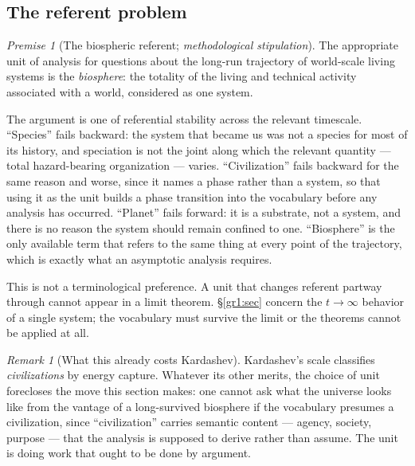 \documentclass[11pt]{article}
\numberwithin{equation}{section}
\theoremstyle{plain}
\theoremstyle{definition}
\theoremstyle{remark}
\newtheorem{remark}[theorem]{Remark}
\newtheorem{premise}{Premise}
\begin{document}
\subsection{The referent problem}\label{gr:sub:referent}

\begin{premise}[The biospheric referent; \emph{methodological
stipulation}]\label{gr:phi1}
The appropriate unit of analysis for questions about the long-run
trajectory of world-scale living systems is the \emph{biosphere}: the
totality of the living and technical activity associated with a world,
considered as one system.
\end{premise}

The argument is one of referential stability across the relevant
timescale. ``Species'' fails backward: the system that became us was
not a species for most of its history, and speciation is not the joint
along which the relevant quantity --- total hazard-bearing organization
--- varies. ``Civilization'' fails backward for the same reason and
worse, since it names a phase rather than a system, so that using it as
the unit builds a phase transition into the vocabulary before any
analysis has occurred. ``Planet'' fails forward: it is a substrate, not
a system, and there is no reason the system should remain confined to
one. ``Biosphere'' is the only available term that refers to the same
thing at every point of the trajectory, which is exactly what an
asymptotic analysis requires.

This is not a terminological preference. A unit that changes referent
partway through cannot appear in a limit theorem. \S\ref{gr1:sec} concern
the $t\to\infty$ behavior of a single system; the vocabulary must
survive the limit or the theorems cannot be applied at all.

\begin{remark}[What this already costs Kardashev]\label{gr:rem:kardvocab}
Kardashev's scale \cite{Kar64} classifies \emph{civilizations} by energy
capture. Whatever its other merits, the choice of unit forecloses the
move this section makes: one cannot ask what the universe looks like
from the vantage of a long-survived biosphere if the vocabulary presumes
a civilization, since ``civilization'' carries semantic content ---
agency, society, purpose --- that the analysis is supposed to derive
rather than assume. The unit is doing work that ought to be done by
argument.
\end{remark}
\end{document}
